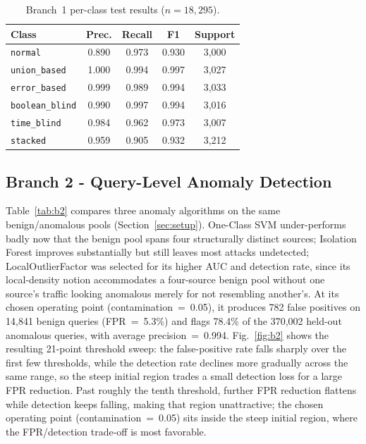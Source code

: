 \documentclass[conference]{IEEEtran}
\begin{document}
\begin{table}[t]
\caption{Branch~1 per-class test results ($n=18{,}295$).}
\label{tab:b1perclass}
\begin{center}
\begin{tabular}{@{}lcccc@{}}
\toprule
\textbf{Class} & \textbf{Prec.} & \textbf{Recall} & \textbf{F1} & \textbf{Support} \\
\midrule
\texttt{normal}        & 0.890 & 0.973 & 0.930 & 3{,}000 \\
\texttt{union\_based}  & 1.000 & 0.994 & 0.997 & 3{,}027 \\
\texttt{error\_based}  & 0.999 & 0.989 & 0.994 & 3{,}033 \\
\texttt{boolean\_blind}& 0.990 & 0.997 & 0.994 & 3{,}016 \\
\texttt{time\_blind}   & 0.984 & 0.962 & 0.973 & 3{,}007 \\
\texttt{stacked}       & 0.959 & 0.905 & 0.932 & 3{,}212 \\
\bottomrule
\end{tabular}
\end{center}
\end{table}

\subsection{Branch 2 - Query-Level Anomaly Detection}
Table~\ref{tab:b2} compares three anomaly algorithms on the same benign/anomalous pools (Section~\ref{sec:setup}). One-Class SVM under-performs badly now that the benign pool spans four structurally distinct sources; Isolation Forest improves substantially but still leaves most attacks undetected; LocalOutlierFactor was selected for its higher AUC and detection rate, since its local-density notion accommodates a four-source benign pool without one source's traffic looking anomalous merely for not resembling another's. At its chosen operating point (contamination~=~0.05), it produces 782 false positives on 14{,}841 benign queries (FPR~=~5.3\%) and flags 78.4\% of the 370{,}002 held-out anomalous queries, with average precision~=~0.994. Fig.~\ref{fig:b2} shows the resulting 21-point threshold sweep: the false-positive rate falls sharply over the first few thresholds, while the detection rate declines more gradually across the same range, so the steep initial region trades a small detection loss for a large FPR reduction. Past roughly the tenth threshold, further FPR reduction flattens while detection keeps falling, making that region unattractive; the chosen operating point (contamination~=~0.05) sits inside the steep initial region, where the FPR/detection trade-off is most favorable.
\end{document}
